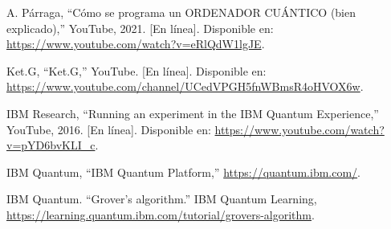 \documentclass{article}
\begin{document}
\begin{thebibliography}{9}

 \label{ref:Teo_Par}
A. Párraga, “Cómo se programa un ORDENADOR CUÁNTICO (bien explicado),” 
YouTube, 2021. [En línea]. Disponible en: 
\url{https://www.youtube.com/watch?v=eRlQdW1lgJE}.

 \label{ref:KetG} Ket.G, “Ket.G,” YouTube. 
[En línea]. Disponible en: \url{https://www.youtube.com/channel/UCedVPGH5fnWBmsR4oHVOX6w}.

 \label{ref:IBM_exp}
IBM Research, “Running an experiment in the IBM Quantum Experience,” 
YouTube, 2016. [En línea]. Disponible en: 
\url{https://www.youtube.com/watch?v=pYD6bvKLI_c}.

 \label{ref:IBM_QUAN} 
IBM Quantum, “IBM Quantum Platform,” \url{https://quantum.ibm.com/}.

 \label{ref:IBM_GROV} IBM Quantum. “Grover's algorithm.” 
IBM Quantum Learning, \url{https://learning.quantum.ibm.com/tutorial/grovers-algorithm}.


\end{thebibliography}
\end{document}
